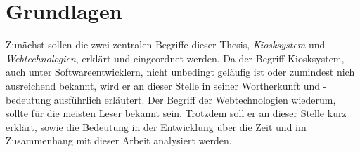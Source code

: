 \chapter{Grundlagen}
\label{chapter:grundlagen}

Zunächst sollen die zwei zentralen Begriffe dieser Thesis, \emph{Kiosksystem} und
\emph{Webtechnologien}, erklärt und eingeordnet werden. Da der Begriff
Kiosksystem, auch unter Softwareentwicklern, nicht unbedingt geläufig ist oder
zumindest nich ausreichend bekannt, wird er an dieser Stelle in seiner Wortherkunft
und -bedeutung ausführlich erläutert. Der Begriff der Webtechnologien wiederum, sollte
für die meisten Leser bekannt sein. Trotzdem soll er an dieser Stelle kurz erklärt, sowie
die Bedeutung in der Entwicklung über die Zeit und im Zusammenhang mit dieser Arbeit
analysiert werden.


